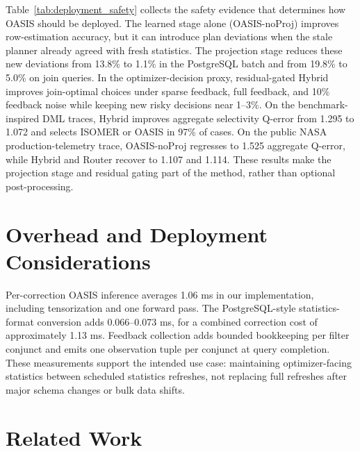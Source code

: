 \documentclass[preprint,12pt]{elsarticle}
\newcommand{\oasisUseMaxWidthResize}[1]{%
  \renewcommand{\resizebox}[3]{\adjustbox{max width=#1}{##3}}%
}
\begin{document}
\begingroup
\oasisUseMaxWidthResize{.97\textwidth}

\endgroup

Table~\ref{tab:deployment_safety} collects the safety evidence that determines
how OASIS should be deployed. The learned stage alone (OASIS-noProj) improves
row-estimation accuracy, but it can introduce plan deviations when the stale
planner already agreed with fresh statistics. The projection stage reduces these
new deviations from 13.8\% to 1.1\% in the PostgreSQL batch and from 19.8\% to
5.0\% on join queries. In the optimizer-decision proxy, residual-gated Hybrid
improves join-optimal choices under sparse feedback, full feedback, and 10\%
feedback noise while keeping new risky decisions near 1--3\%. On the
benchmark-inspired DML traces, Hybrid improves aggregate selectivity Q-error
from 1.295 to 1.072 and selects ISOMER or OASIS in 97\% of cases. On
the public NASA production-telemetry trace, OASIS-noProj regresses to 1.525
aggregate Q-error, while Hybrid and Router recover to 1.107 and 1.114. These
results make the projection stage and residual gating part of the method,
rather than optional post-processing.

\section{Overhead and Deployment Considerations}
\label{sec:overhead}

Per-correction OASIS inference averages 1.06 ms in our implementation,
including tensorization and one forward pass. The PostgreSQL-style
statistics-format conversion adds 0.066--0.073 ms, for a combined correction
cost of approximately 1.13 ms. Feedback collection adds bounded bookkeeping
per filter conjunct and emits one observation tuple per conjunct at query
completion. These measurements support the intended use case: maintaining
optimizer-facing statistics between scheduled statistics refreshes, not
replacing full refreshes after major schema changes or bulk data shifts.



\section{Related Work}
\label{sec:related}
\end{document}
